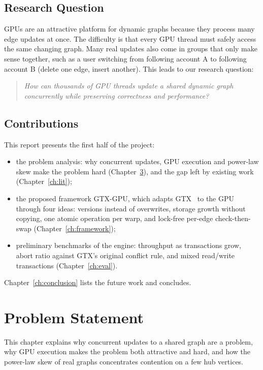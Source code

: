 \documentclass[11pt,a4paper,oneside]{report}
\newcommand{\sys}{GTX-GPU}
\begin{document}
\section{Research Question}
GPUs are an attractive platform for dynamic graphs because they process many edge updates at once. The difficulty is
that every GPU thread must safely access the same changing graph. Many real updates also come in groups that only make
sense together, such as a user switching from following account A to following account B (delete one edge, insert
another). This leads to our research question:
\begin{quote}
\emph{How can thousands of GPU threads update a shared dynamic graph concurrently while preserving correctness and
performance?}
\end{quote}

\section{Contributions}
This report presents the first half of the project:
\begin{itemize}
\item the problem analysis: why concurrent updates, GPU execution and power-law skew make the problem hard
  (Chapter~\ref{ch:problem}), and the gap left by existing work (Chapter~\ref{ch:lit});
\item the proposed framework \sys{}, which adapts GTX~\cite{gtx} to the GPU through four ideas: versions instead of
  overwrites, storage growth without copying, one atomic operation per warp, and lock-free per-edge check-then-swap
  (Chapter~\ref{ch:framework});
\item preliminary benchmarks of the engine: throughput as transactions grow, abort ratio against GTX's original
  conflict rule, and mixed read/write transactions (Chapter~\ref{ch:eval}).
\end{itemize}
Chapter~\ref{ch:conclusion} lists the future work and concludes.

\chapter{Problem Statement}
\label{ch:problem}
This chapter explains why concurrent updates to a shared graph are a problem, why GPU execution makes the problem both
attractive and hard, and how the power-law skew of real graphs concentrates contention on a few hub vertices.
\end{document}
